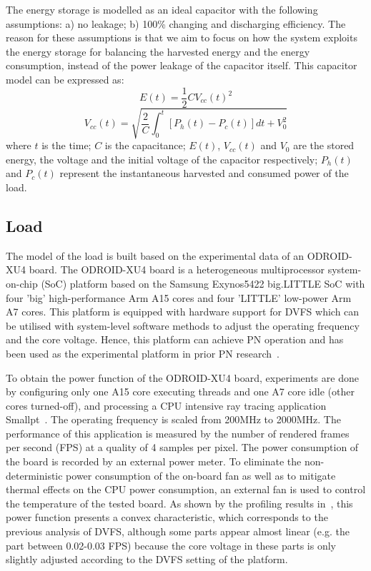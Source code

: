 The energy storage is modelled as an ideal capacitor with the following assumptions: a) no leakage; b) 100\% changing and discharging efficiency. The reason for these assumptions is that we aim to focus on how the system exploits the energy storage for balancing the harvested energy and the energy consumption, instead of the power leakage of the capacitor itself. This capacitor model can be expressed as:
\begin{equation}
    E(t) = \frac{1}{2} C V_{cc}(t)^2
\end{equation}
\begin{equation}
    V_{cc}(t) = \sqrt{\frac{2}{C} \int_0^t [P_h(t) - P_c(t)] dt + V_0^2}
\end{equation}
where $t$ is the time; $C$ is the capacitance; $E(t)$, $V_{cc}(t)$ and $V_0$ are the stored energy, the voltage and the initial voltage of the capacitor respectively; $P_h(t)$ and $P_c(t)$ represent the instantaneous harvested and consumed power of the load.

\subsection{Load}

The model of the load is built based on the experimental data of an ODROID-XU4 board. The ODROID-XU4 board is a heterogeneous multiprocessor system-on-chip (SoC) platform based on the Samsung Exynos5422 big.LITTLE SoC with four 'big' high-performance Arm A15 cores and four 'LITTLE' low-power Arm A7 cores. This platform is equipped with hardware support for DVFS which can be utilised with system-level software methods to adjust the operating frequency and the core voltage. Hence, this platform can achieve PN operation and has been used as the experimental platform in prior PN research~\cite{fletcher2017power}.

To obtain the power function of the ODROID-XU4 board, experiments are done by configuring only one A15 core executing threads and one A7 core idle (other cores turned-off), and processing a CPU intensive ray tracing application Smallpt~\cite{beason10}. The operating frequency is scaled from 200MHz to 2000MHz. The performance of this application is measured by the number of rendered frames per second (FPS) at a quality of 4 samples per pixel. The power consumption of the board is recorded by an external power meter. To eliminate the non-deterministic power consumption of the on-board fan as well as to mitigate thermal effects on the CPU power consumption, an external fan is used to control the temperature of the tested board. As shown by the profiling results in~, this power function presents a convex characteristic, which corresponds to the previous analysis of DVFS, although some parts appear almost linear (e.g. the part between 0.02-0.03 FPS) because the core voltage in these parts is only slightly adjusted according to the DVFS setting of the platform.

